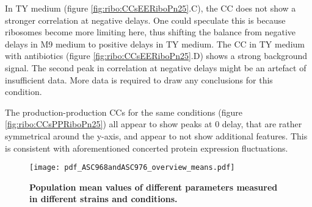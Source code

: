 In TY medium (figure \ref{fig:ribo:CCsEERiboPn25}.C), the CC does not show a stronger correlation at negative delays.
%
One could speculate this is because ribosomes become more limiting here, thus shifting the balance from negative delays in M9 medium to positive delays in TY medium.
%
The CC in TY medium with antibiotics (figure \ref{fig:ribo:CCsEERiboPn25}.D) shows a strong background signal.
The second peak in correlation at negative delays might be an artefact of insufficient data.
More data is required to draw any conclusions for this condition. 


The production-production CCs for the same conditions (figure \ref{fig:ribo:CCsPPRiboPn25}) all appear to show peaks at 0 delay, that are rather symmetrical around the y-axis, and appear to not show additional features.
This is consistent with aforementioned concerted protein expression fluctuations.



\begin{figure}
    \centering
    \texttt{[image: pdf\_ASC968andASC976\_overview\_means.pdf]}
    \caption{ 
        \textbf{Population mean values of different parameters measured in different strains and conditions.}
    }
    \label{fig:ribo:meansPn25R}
\end{figure}


